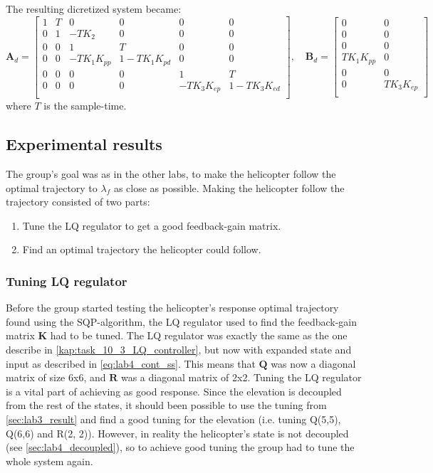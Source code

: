 \documentclass[../main.tex]{subfiles}
\begin{document}
The resulting dicretized system became: 
\begin{equation}\label{eq:lab4_disc_ss}
	\bm A_d = \begin{bmatrix}
		1 & T & 0 & 0 & 0 & 0\\
		0 & 1 & -TK_2 & 0 & 0 & 0\\
		0 & 0 & 1 & T & 0 & 0\\
		0 & 0 & -T K_1 K_{pp} &  1 - T K_1 K_{pd} & 0 & 0\\
		0 & 0 & 0 & 0 & 1 & T \\
		0 & 0 & 0 & 0 & -T K_3 K_{ep} & 1 - TK_3K_{ed} \\
	\end{bmatrix}, \quad
	\bm B_d = \begin{bmatrix}
		0 & 0 \\
		0 & 0\\
		0 & 0\\
		T K_1 K_{pp} & 0\\
		0 & 0 \\
		0 & T K_3K_{ep} \\
	\end{bmatrix}
\end{equation}
where $ T $ is the sample-time.

\subsection{Experimental results}
The group's goal was as in the other labs, to make the helicopter follow the optimal trajectory to $ \lambda_f $ as close as possible. Making the helicopter follow the trajectory consisted of two parts: 
\begin{enumerate}
	\item Tune the LQ regulator to get a good feedback-gain matrix.
	\item Find an optimal trajectory the helicopter could follow.
\end{enumerate}

\subsubsection{Tuning LQ regulator}
Before the group started testing the helicopter's response optimal trajectory found using the SQP-algorithm, the LQ regulator used to find the feedback-gain matrix $\bm K$ had to be tuned. The LQ regulator was exactly the same as the one describe in \cref{kap:task_10_3_LQ_controller}, but now with expanded state and input as described in \cref{eq:lab4_cont_ss}. This means that $ \bm Q $ was now a diagonal matrix of size 6x6, and $ \bm R $ was a diagonal matrix of 2x2. Tuning the LQ regulator is a vital part of achieving as good response. Since the elevation is decoupled from the rest of the states, it should been possible to use the tuning from \cref{sec:lab3_result} and find a good tuning for the elevation (i.e. tuning Q(5,5), Q(6,6) and R(2, 2)). However, in reality the helicopter's state is not decoupled (see \cref{sec:lab4_decoupled}), so to achieve good tuning the group had to tune the whole system again.
\end{document}
